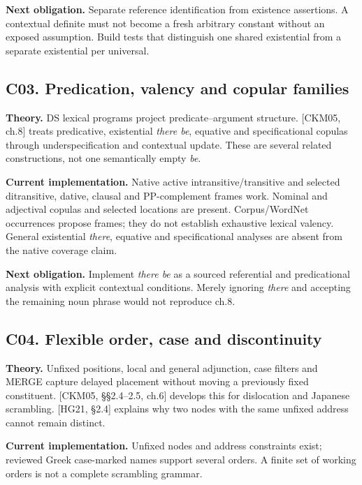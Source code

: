 \documentclass[11pt,a4paper]{article}
\begin{document}
\textbf{Next obligation.} Separate reference identification from
existence assertions. A contextual definite must not become a fresh
arbitrary constant without an exposed assumption. Build tests that
distinguish one shared existential from a separate existential per
universal.

\subsection{C03. Predication, valency and copular
families}\label{c03.-predication-valency-and-copular-families}

\textbf{Theory.} DS lexical programs project predicate--argument
structure. {[}CKM05, ch.8{]} treats predicative, existential \emph{there
be}, equative and specificational copulas through underspecification and
contextual update. These are several related constructions, not one
semantically empty \emph{be}.

\textbf{Current implementation.} Native active intransitive/transitive
and selected ditransitive, dative, clausal and PP-complement frames
work. Nominal and adjectival copulas and selected locations are present.
Corpus/WordNet occurrences propose frames; they do not establish
exhaustive lexical valency. General existential \emph{there}, equative
and specificational analyses are absent from the native coverage claim.

\textbf{Next obligation.} Implement \emph{there be} as a sourced
referential and predicational analysis with explicit contextual
conditions. Merely ignoring \emph{there} and accepting the remaining
noun phrase would not reproduce ch.8.

\subsection{C04. Flexible order, case and
discontinuity}\label{c04.-flexible-order-case-and-discontinuity}

\textbf{Theory.} Unfixed positions, local and general adjunction, case
filters and MERGE capture delayed placement without moving a previously
fixed constituent. {[}CKM05, §§2.4--2.5, ch.6{]} develops this for
dislocation and Japanese scrambling. {[}HG21, §2.4{]} explains why two
nodes with the same unfixed address cannot remain distinct.

\textbf{Current implementation.} Unfixed nodes and address constraints
exist; reviewed Greek case-marked names support several orders. A finite
set of working orders is not a complete scrambling grammar.
\end{document}
